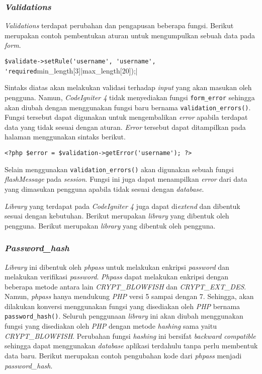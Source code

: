 \subsubsection{\textit{Validations}}
\textit{Validations} terdapat perubahan dan pengapusan beberapa fungsi. Berikut merupakan contoh pembentukan aturan untuk mengumpulkan sebuah data pada \textit{form}.
\begin{center}
\verb|$validate->setRule('username', 'username', 'required|min\_length[3]|max\_length[20]);|
\end{center}
Sintaks diatas akan melakukan validasi terhadap \textit{input} yang akan masukan oleh pengguna. Namun, \textit{CodeIgniter 4} tidak menyediakan fungsi \texttt{form\_error} sehingga akan diubah dengan menggunakan fungsi baru bernama \texttt{validation\_errors()}. Fungsi tersebut dapat digunakan untuk mengembalikan \textit{error} apabila terdapat data yang tidak sesuai dengan aturan. \textit{Error} tersebut dapat ditampilkan pada halaman menggunakan sintaks berikut.

\begin{center}
\verb|<?php $error = $validation->getError('username'); ?>|
\end{center}

Selain menggunakan \texttt{validation\_errors()} akan digunakan sebuah fungsi \textit{flashMessage} pada \textit{session}. Fungsi ini juga dapat menampilkan \textit{error} dari data yang dimasukan pengguna apabila tidak sesuai dengan \textit{database}.

\textit{Library} yang terdapat pada \textit{CodeIgniter 4} juga dapat di\textit{extend} dan dibentuk sesuai dengan kebutuhan. Berikut merupakan \textit{library} yang dibentuk oleh pengguna. Berikut merupakan \textit{library} yang dibentuk oleh pengguna.
\iffalse
\subsubsection{\textit{Zip Encoding}}
\fi
\subsubsection{\textit{Password\_hash}}
\textit{Library} ini dibentuk oleh \textit{phpass} untuk melakukan enkripsi \textit{password} dan melakukan verifikasi \textit{password}. \textit{Phpass} dapat melakukan enkripsi dengan beberapa metode antara lain \textit{CRYPT\_BLOWFISH} dan \textit{CRYPT\_EXT\_DES}. Namun, \textit{phpass} hanya mendukung \textit{PHP} versi 5 sampai dengan 7. Sehingga, akan dilakukan konversi menggunakan fungsi yang disediakan oleh \textit{PHP} bernama \texttt{password\_hash()}. Seluruh penggunaan \textit{library} ini akan diubah menggunakan fungsi yang disediakan oleh \textit{PHP} dengan metode \textit{hashing} sama yaitu \textit{CRYPT\_BLOWFISH}. Perubahan fungsi \textit{hashing} ini bersifat \textit{backward compatible} sehingga dapat menggunakan \textit{database} aplikasi terdahulu tanpa perlu membentuk data baru. Berikut merupakan contoh pengubahan kode dari \textit{phpass} menjadi \textit{password\_hash}.

